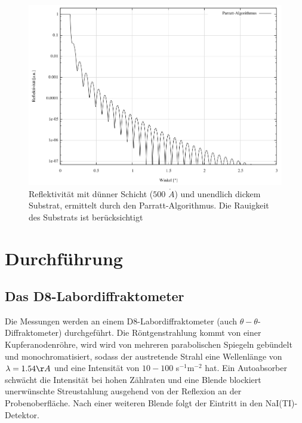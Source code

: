 \begin{figure}[H]
 \includegraphics[width=\textwidth]{../pics/rau.jpg}
 \caption{Reflektivität mit dünner Schicht ($500$ $\mathring{A}$) und unendlich dickem Substrat, ermittelt durch den Parratt-Algorithmus. Die Rauigkeit des Substrats ist berücksichtigt}
 \label{pic_ReflRau}
\end{figure}


\section{Durchführung}
\subsection{Das D8-Labordiffraktometer}
Die Messungen werden an einem D8-Labordiffraktometer (auch $\theta - \theta$-Diffraktometer) durchgeführt. Die Röntgenstrahlung kommt von einer 
Kupferanodenröhre, wird wird von mehreren parabolischen Spiegeln gebündelt und monochromatisiert, sodass der austretende Strahl eine Wellenlänge von
$\lambda = 1.54 \AA$ und eine Intensität von $10-100$ s$^{-1}$m$^{-2}$ hat. Ein Autoabsorber schwächt die Intensität bei hohen Zählraten und eine Blende
blockiert unerwünschte Streustahlung ausgehend von der Reflexion an der Probenoberfläche. Nach einer weiteren Blende folgt der Eintritt in den NaI(TI)-Detektor.
